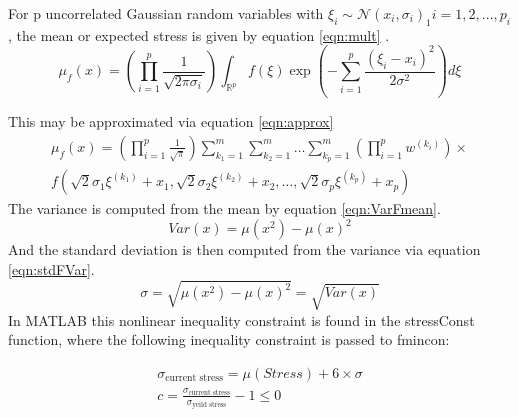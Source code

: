 \documentclass[12pt]{article}
\begin{document}
	
	For p uncorrelated Gaussian random variables with $\xi _ { i } \sim \mathcal { N } \left( x _ { i } , \sigma _ { i } \right) _ { 1 } i = 1,2 , \ldots , p _ { i}$, the mean or expected stress is given by equation \ref{eqn:mult} \cite{Hicken18}.  
	\begin{equation}
	\mu _ { f } ( x ) = \left( \prod _ { i = 1 } ^ { p } \frac { 1 } { \sqrt { 2 \pi \sigma _ { i } } } \right) \int _ { \mathbb { R } ^ { p } } f ( \xi ) \exp \left( - \sum _ { i = 1 } ^ { p } \frac { \left( \xi _ { i } - x _ { i } \right) ^ { 2 } } { 2 \sigma ^ { 2 } } \right) d \xi
	\label{eqn:mult}
	\end{equation}
	
	This may be approximated via equation \ref{eqn:approx} \cite{Hicken18}
	\begin{align}
	\mu _ { f } ( x ) = \left( \prod _ { i = 1 } ^ { p } \frac { 1 } { \sqrt { \pi } } \right) \sum _ { k _ { 1 } = 1 } ^ { m } \sum _ { k _ { 2 } = 1 } ^ { m } \ldots \sum _ { k _ { p } = 1 } ^ { m } \left( \prod _ { i = 1 } ^ { p } w ^ { \left( k _ { i } \right) } \right) 	\times\label{eqn:approx} \\\nonumber
 f \left( \sqrt { 2 } \sigma _ { 1 } \xi ^ { \left( k _ { 1 } \right) } + x _ { 1 } , \sqrt { 2 } \sigma _ { 2 } \xi ^ { \left( k _ { 2 } \right) } + x _ { 2 } , \ldots , \sqrt { 2 } \sigma _ { p } \xi ^ { \left( k _ { p } \right) } + x _ { p } \right)
	\end{align}
	The variance is computed from the mean by equation \ref{eqn:VarFmean}.
	\begin{equation}
	Var(x)=\mu(x^2)-\mu(x)^2
	\label{eqn:VarFmean}
	\end{equation}
	And the standard deviation is then computed from the variance via equation \ref{eqn:stdFVar}.
	\begin{equation}
	\sigma=\sqrt{\mu(x^2)-\mu(x)^2}=\sqrt{Var(x)}
	\label{eqn:stdFVar}
	\end{equation}
	In MATLAB this nonlinear inequality constraint is found in the stressConst function, where the following inequality constraint is passed to fmincon:
	
	
	\begin{align}
	\sigma_\text{current stress}=\mu(Stress)+6\times \sigma\\\nonumber
	c=\frac{\sigma_\text{current stress}}{\sigma_\text{yeild stress}}-1\leq 0
	\end{align}
	
\end{document}
